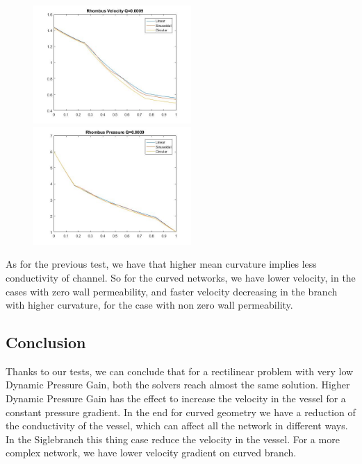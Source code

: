 \documentclass[a4paper]{report}
\begin{document}
\begin{figure}[htbp]
\centering
\includegraphics[width= 60mm]{Rombus_Velocity1}%
\qquad \qquad
\includegraphics[width= 60mm]{Rombus_Pressure1}
\end{figure}

As for the previous test, we have that higher mean curvature implies less conductivity of channel. So for the curved networks, we have lower velocity, in the cases with zero wall permeability, and faster velocity decreasing in the branch with higher curvature, for the case with non zero wall permeability.

\subsection{Conclusion}
Thanks to our tests, we can conclude that for a rectilinear problem with very low Dynamic Pressure Gain, both the solvers reach almost the same solution.
Higher Dynamic Pressure Gain has the effect to increase the velocity in the vessel for a constant pressure gradient.
In the end for curved geometry we have a reduction of the conductivity of the vessel, which can affect all the network in different ways. In the Siglebranch this thing case reduce the velocity in the vessel. For a more complex network, we have lower velocity gradient on curved branch.


\newpage
\end{document}
